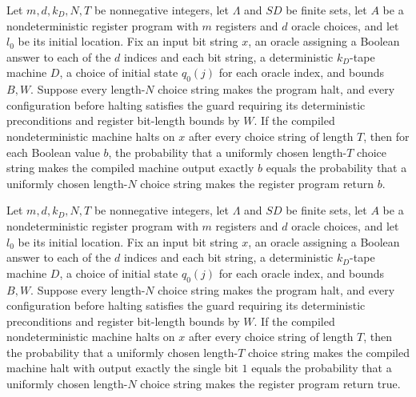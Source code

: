 \begin{theorem}
\label{Complexity.LogProg.narm_randProb}
\leanok
{}
Let $m,d,k_D,N,T$ be nonnegative integers, let $\Lambda$ and $SD$ be finite sets, let
$A$ be a nondeterministic register program with $m$ registers and $d$ oracle choices,
and let $l_0$ be its initial location. Fix an input bit string $x$, an oracle assigning
a Boolean answer to each of the $d$ indices and each bit string, a deterministic
$k_D$-tape machine $D$, a choice of initial state $q_0(j)$ for each oracle index, and
bounds $B,W$. Suppose every length-$N$ choice string makes the program halt, and every
configuration before halting satisfies the guard requiring its deterministic
preconditions and register bit-length bounds by $W$. If the compiled nondeterministic
machine halts on $x$ after every choice string of length $T$, then for each Boolean
value $b$, the probability that a uniformly chosen length-$T$ choice string makes the
compiled machine output exactly $b$ equals the probability that a uniformly chosen
length-$N$ choice string makes the register program return $b$.
\end{theorem}

\begin{theorem}
\label{Complexity.LogProg.narm_randProb_accept}
\leanok
{}
Let $m,d,k_D,N,T$ be nonnegative integers, let $\Lambda$ and $SD$ be finite sets, let
$A$ be a nondeterministic register program with $m$ registers and $d$ oracle choices,
and let $l_0$ be its initial location. Fix an input bit string $x$, an oracle assigning
a Boolean answer to each of the $d$ indices and each bit string, a deterministic
$k_D$-tape machine $D$, a choice of initial state $q_0(j)$ for each oracle index, and
bounds $B,W$. Suppose every length-$N$ choice string makes the program halt, and every
configuration before halting satisfies the guard requiring its deterministic
preconditions and register bit-length bounds by $W$. If the compiled nondeterministic
machine halts on $x$ after every choice string of length $T$, then the probability that
a uniformly chosen length-$T$ choice string makes the compiled machine halt with output
exactly the single bit $1$ equals the probability that a uniformly chosen length-$N$
choice string makes the register program return true.
\end{theorem}

